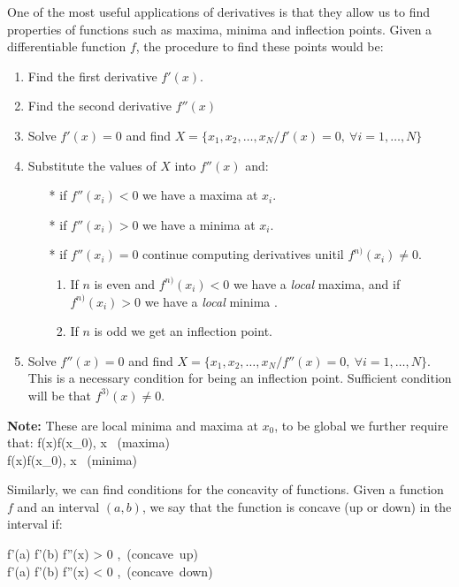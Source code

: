 One of the most useful applications of derivatives is that they allow us
to find properties of functions such as maxima, minima and inflection points. Given a differentiable
function $f$, the procedure to find these points would be:

\begin{enumerate}
	\item Find the first derivative $f'(x)$.
	\item Find the second derivative $f''(x)$
	\item Solve $f'(x)=0$ and find $X=\{x_1,x_2,\ldots,x_N / f'(x)=0,\ \forall i=1,\ldots,N\}$
	\item Substitute the values of $X$ into $f''(x)$ and:
	\begin{enumerate}
		 \item[*] if $f''(x_i)<0$ we have a maxima at $x_i$.
    	 \item[*] if $f''(x_i)>0$ we have a minima at $x_i$.
    	 \item[*] if $f''(x_i)=0$ continue computing derivatives unitil $f^{n)}(x_i)\neq 0$.
    	 \begin{enumerate}
    	 	\item If $n$ is even and $f^{n)}(x_i)< 0$ we have a {\em local} maxima, and if
    	 	$f^{n)}(x_i)> 0$ we have a {\em local} minima .
    	 	\item If  $n$ is odd we get an inflection point.
    	 \end{enumerate}
	\end{enumerate}
	\item Solve  $f''(x)=0$ and find $X=\{x_1,x_2,\ldots,x_N / f''(x)=0,\ \forall i=1,\ldots,N\}$. This is a necessary condition for being an inflection point. Sufficient condition will be that $f^{3)}(x)\neq 0$.
\end{enumerate}

{\bf Note: } These are local minima and maxima at $x_0$, to be global we further require that:
\bnn
	f(x)\leq f(x_0), \quad \forall x \mbox{ (maxima)}\\
		f(x)\geq f(x_0), \quad \forall x \mbox{ (minima)}	
\enn

Similarly, we can find conditions for the concavity of functions. Given a function $f$ and an interval $(a,b)$, we say that the function is concave (up or down) in the interval if:

\bnn
	f'(a) \leq f'(b) \Rightarrow f''(x) > 0 \mbox{, (concave up)} \\
		f'(a) \geq f'(b) \Rightarrow f''(x) < 0 \mbox{, (concave down)}
\enn

